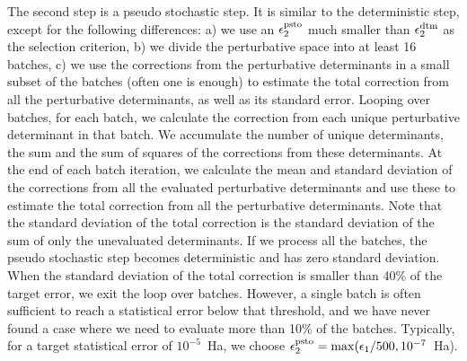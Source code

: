 \documentclass[%
reprint,
 superscriptaddress,
 amsmath,amssymb,
 aps,
]{revtex4-1}
\begin{document}
The second step is a pseudo stochastic step.
It is similar to the deterministic step, except for the following differences: 
a) we use an $\epsilon_2^{\rm psto}$ much smaller than $\epsilon_2^{\rm dtm}$ as the selection criterion,
b) we divide the perturbative space into at least 16 batches,
c) we use the corrections from the perturbative determinants in a small subset of the batches (often one is enough)
to estimate the total correction from all the perturbative determinants, as well as its standard error.
Looping over batches, for each batch, we calculate the correction from each unique perturbative determinant in that batch.
We accumulate the number of unique determinants, the sum and the sum of squares of the corrections from these determinants.
At the end of each batch iteration, we calculate the mean and standard deviation of the corrections from all the
evaluated perturbative determinants and use these to estimate the total correction from all the perturbative determinants.
Note that the standard deviation of the total correction is the standard deviation of the sum of only the unevaluated determinants.
If we process all the batches, the pseudo stochastic step becomes deterministic and has zero standard deviation.
When the standard deviation of the total correction is smaller than 40\% of the target error, we exit the loop over batches.
However, a single batch is often sufficient to reach a statistical error below that threshold,
and we have never found a case where we need to evaluate more than 10\% of the batches.
Typically, for a target statistical error of $10^{-5}$~Ha, we choose $\epsilon_2^{\rm psto} = \max(\epsilon_{1}/500, 10^{-7}$~Ha).
\end{document}
